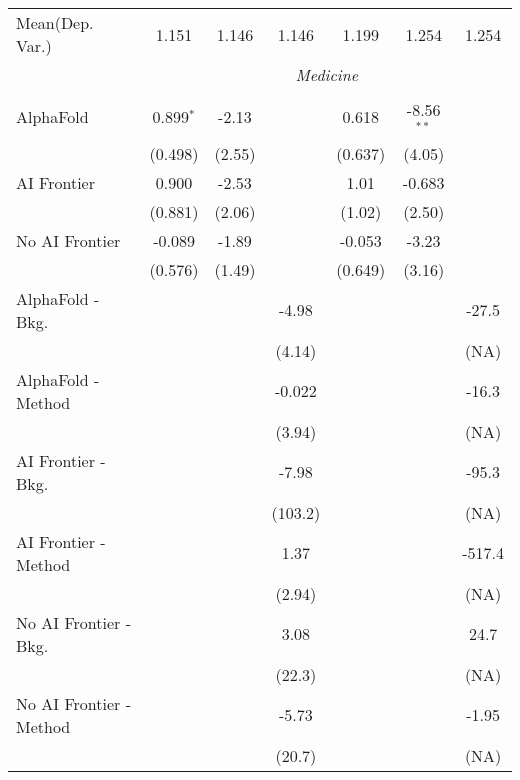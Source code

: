 \begin{tabular}{lcccccc}
Mean(Dep. Var.) & 1.151 & 1.146 & 1.146 & 1.199 & 1.254 & 1.254 \\
 & \multicolumn{6}{c}{\textit{Medicine}} \\ \\
   AlphaFold               & 0.899$^{*}$ & -2.13  &         & 0.618   & -8.56$^{**}$ &   \\   
                           & (0.498)     & (2.55) &         & (0.637) & (4.05)       &   \\   
   AI Frontier             & 0.900       & -2.53  &         & 1.01    & -0.683       &   \\   
                           & (0.881)     & (2.06) &         & (1.02)  & (2.50)       &   \\   
   No AI Frontier          & -0.089      & -1.89  &         & -0.053  & -3.23        &   \\   
                           & (0.576)     & (1.49) &         & (0.649) & (3.16)       &   \\   
   AlphaFold - Bkg.        &             &        & -4.98   &         &              & -27.5\\   
                           &             &        & (4.14)  &         &              & (NA)\\   
   AlphaFold - Method      &             &        & -0.022  &         &              & -16.3\\   
                           &             &        & (3.94)  &         &              & (NA)\\   
   AI Frontier - Bkg.      &             &        & -7.98   &         &              & -95.3\\   
                           &             &        & (103.2) &         &              & (NA)\\   
   AI Frontier - Method    &             &        & 1.37    &         &              & -517.4\\   
                           &             &        & (2.94)  &         &              & (NA)\\   
   No AI Frontier - Bkg.   &             &        & 3.08    &         &              & 24.7\\   
                           &             &        & (22.3)  &         &              & (NA)\\   
   No AI Frontier - Method &             &        & -5.73   &         &              & -1.95\\   
                           &             &        & (20.7)  &         &              & (NA)\\   

\end{tabular}
